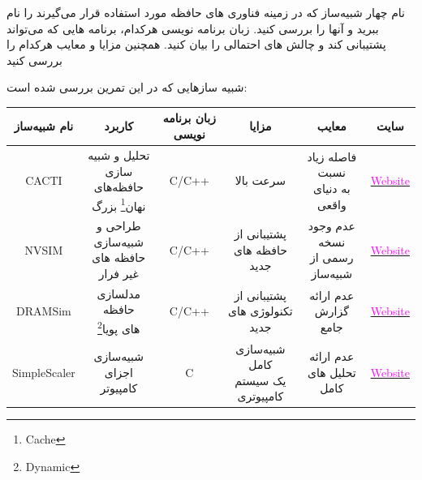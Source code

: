 \documentclass[12pt]{exam}
\newcommand{\class}{\ThesisClass}
\begin{document}

\pagestyle{empty}


\pagestyle{head}
\firstpageheader{}{}{}
\runningheader{صفحه \thepage\ از \numpages}{}{\class}
\runningheadrule

\vspace{0pt}


\begin{questions}
	
	
	\question 
	نام چهار شبیه‌ساز که در زمینه فناوری های حافظه مورد استفاده قرار می‌گیرند را نام ببرید و آنها را بررسی کنید. زبان برنامه نویسی هرکدام، برنامه هایی که می‌تواند پشتیبانی کند و چالش های احتمالی را بیان کنید. همچنین مزایا و معایب هرکدام را بررسی کنید


شبیه ساز‌هایی که در این تمرین بررسی شده است:



\begin{center}
	\begin{tabular}{||c c c c c c||} 
		\hline
		نام شبیه‌ساز & کاربرد & زبان برنامه نویسی & مزایا & معایب & سایت \\ [0.5ex] 
		\hline\hline
		CACTI & \thead{تحلیل و شبیه سازی \\حافظه‌های \\ نهان\footnote{Cache} بزرگ} & C/C++ & سرعت بالا & \thead{فاصله زیاد نسبت \\به دنیای واقعی} & \href{https://www.hpl.hp.com/research/cacti/}{\textcolor{magenta}{Website}} \\ 
		\hline
		NVSIM & \thead{طراحی و شبیه‌سازی \\ حافظه های غیر فرار} & C/C++ & \thead{پشتیبانی از \\ حافظه های جدید} & \thead{عدم وجود نسخه \\ رسمی از شبیه‌ساز} & \href{http://nvsim.org/}{\textcolor{magenta}{Website}} \\
		\hline
		DRAMSim & \thead{مدلسازی حافظه\\ های پویا\footnote{Dynamic}} & C/C++ & \thead{پشتیبانی از \\ تکنولوژی های جدید} & \thead{عدم ارائه \\ گزارش جامع} & \href{https://par.nsf.gov/servlets/purl/10216399}{\textcolor{magenta}{Website}} \\
		\hline
		SimpleScaler & \thead{شبیه‌سازی اجزای\\کامپیوتر} & C & \thead{شبیه‌سازی کامل\\یک سیستم کامپیوتری} & \thead{عدم ارائه\\تحلیل های کامل} & \href{www.simplescalar.com}{\textcolor{magenta}{Website}} \\
		[1ex] 
		\hline
	\end{tabular}
\end{center}






\end{questions}
\end{document}
